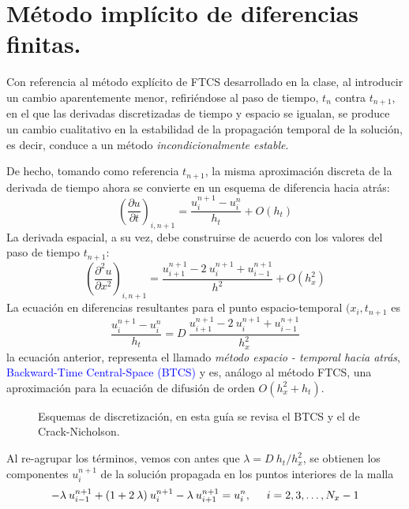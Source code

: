 \section{Método implícito de diferencias finitas.}
Con referencia al método explícito de FTCS desarrollado en la clase, al introducir un cambio aparentemente menor, refiriéndose al paso de tiempo, $t_{n}$ contra $t_{n+1}$, en el que las derivadas discretizadas de tiempo y espacio se igualan, se produce un cambio cualitativo en la estabilidad de la propagación temporal de la solución, es decir, conduce a un método \emph{incondicionalmente estable}.
\par
De hecho, tomando como referencia $t_{n+1}$, la misma aproximación discreta de la derivada de tiempo ahora se convierte en un esquema de diferencia hacia atrás:
\begin{equation}
\left( \dfrac{\partial u}{\partial t} \right)_{i, n+1} = \dfrac{u_{i}^{n+1} - u_{i}^{n}}{h_{t}} + O(h_{t})
\label{eq:ecuacion_13_63}
\end{equation}
La derivada espacial, a su vez, debe construirse de acuerdo con los valores del paso de tiempo $t_{n+1}$:
\begin{equation}
\left( \dfrac{\partial^{2} u}{\partial x^{2}} \right)_{i, n+1} = \dfrac{u_{i+1}^{n+1} - 2\: u_{i}^{n+1} + u_{i-1}^{n+1}}{h^{2}} + O(h_{x}^{2})
\label{eq:ecuacion_13_64}
\end{equation}
La ecuación en diferencias resultantes para el punto espacio-temporal $(x_{i}, t_{n+1}$ es
\begin{equation}
\dfrac{u_{i}^{n+1} - u_{i}^{n}}{h_{t}} =  D \: \dfrac{u_{i+1}^{n+1} - 2\: u_{i}^{n+1} + u_{i-1}^{n+1}}{h_{x}^{2}}
\label{eq:ecuacion_13_65}
\end{equation}
la ecuación anterior, representa el llamado \emph{método espacio - temporal hacia atrás}, \textcolor{blue}{Backward-Time Central-Space (BTCS)} y es, análogo al método FTCS, una aproximación para la ecuación de difusión de orden $O(h_{x}^{2} + h_{t})$.
\begin{figure}[H]
	\centering
	
	\caption{Esquemas de discretización, en esta guía se revisa el BTCS y el de Crack-Nicholson.}
	\label{fig:figura_01}
\end{figure}
Al re-agrupar los términos, vemos con antes que $\lambda = D \: h_{t} / h_{x}^{2}$, se obtienen los componentes $u_{i}^{n+1}$ de la solución propagada en los puntos interiores de la malla
\begin{equation}
- \lambda \: u_{i-1}^{n+1} + (1 + 2 \: \lambda) \: u_{i}^{n+1} - \lambda \: u_{i+1}^{n+1} = u_{i}^{n}, \hspace{0.5cm} i = 2, 3, \ldots, N_{x} - 1
\label{eq:ecuacion_13_66}
\end{equation}
